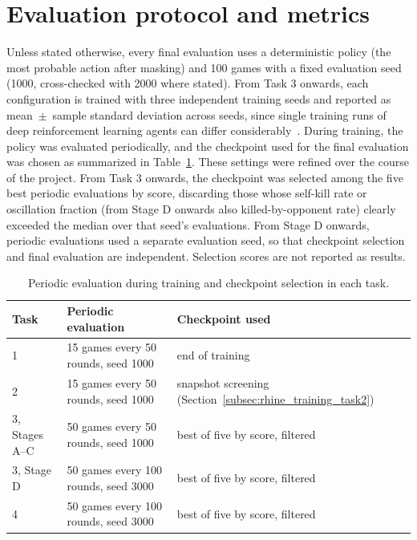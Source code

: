 \documentclass[11pt,a4paper]{report}
\begin{document}
	\section{Evaluation protocol and metrics}
	\label{subsec:rhine_eval_protocol_metrics}
	
	Unless stated otherwise, every final evaluation uses a deterministic policy (the most probable action after masking) and 100 games with a fixed evaluation seed (1000, cross-checked with 2000 where stated). From Task 3 onwards, each configuration is trained with three independent training seeds and reported as mean~$\pm$~sample standard deviation across seeds, since single training runs of deep reinforcement learning agents can differ considerably~\cite{henderson2018matters}. During training, the policy was evaluated periodically, and the checkpoint used for the final evaluation was chosen as summarized in Table~\ref{tab:rhine_eval_settings}. These settings were refined over the course of the project. From Task 3 onwards, the checkpoint was selected among the five best periodic evaluations by score, discarding those whose self-kill rate or oscillation fraction (from Stage D onwards also killed-by-opponent rate) clearly exceeded the median over that seed's evaluations. From Stage D onwards, periodic evaluations used a separate evaluation seed, so that checkpoint selection and final evaluation are independent. Selection scores are not reported as results.
	
	\begin{table}[htbp]
		\centering
		\small
		\begin{tabular}{lll}
			\toprule
			Task & Periodic evaluation & Checkpoint used \\
			\midrule
			1 & 15 games every 50 rounds, seed 1000 & end of training \\
			2 & 15 games every 50 rounds, seed 1000 & snapshot screening (Section~\ref{subsec:rhine_training_task2}) \\
			3, Stages A--C & 50 games every 50 rounds, seed 1000 & best of five by score, filtered \\
			3, Stage D & 50 games every 100 rounds, seed 3000 & best of five by score, filtered \\
			4 & 50 games every 100 rounds, seed 3000 & best of five by score, filtered \\
			\bottomrule
		\end{tabular}
		\caption{Periodic evaluation during training and checkpoint selection in each task.}
		\label{tab:rhine_eval_settings}
	\end{table}
	
\end{document}
